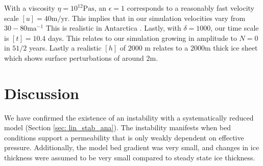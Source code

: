 \documentclass[journal abbreviation, manuscript]{copernicus}
\begin{document}
With a viscosity $\eta= 10^{12} \mathbin{\mathrm{Pa}} \mathbin{\mathrm{s}}$, an $\epsilon = 1$ corresponds to a reasonably fast velocity scale $[u]=40 \mbox{m}/\mbox{yr}$. This implies that in our simulation velocities vary from $30-80\mbox{ma}^{-1}$ This is realistic in Antarctica \citep{rignot2011ice}. Lastly, with $\delta = 1000$, our time scale is $[t]=10.4$ days. This relates to our simulation growing in amplitude to $N=0$ in $5 1/2$ years.  
Lastly a realistic $[h]$ of $2000 \mbox{ m}$ \citep{fretwell2013bedmap2} relates to a 2000m thick ice sheet which shows surface perturbations of around 2m.

\section{Discussion} \label{sec:Discussion}



We have confirmed the existence of an instability with a
systematically reduced model (Section \ref{sec: lin_stab_ana}). The instability manifests when bed conditions support a permeability that is only weakly dependent on effective pressure.
Additionally, the model bed gradient was very small, and
changes in ice thickness were assumed to be very small compared to steady state ice thickness. 
\end{document}
